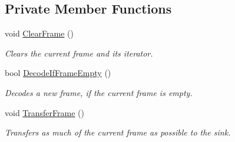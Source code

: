 \subsection*{Private Member Functions}
\begin{DoxyCompactItemize}
\item 
\hypertarget{classAudio_ad35726949e5de23e62024eba476c7ecf}{void \hyperlink{classAudio_ad35726949e5de23e62024eba476c7ecf}{Clear\+Frame} ()}\label{classAudio_ad35726949e5de23e62024eba476c7ecf}

\begin{DoxyCompactList}\small\item\em Clears the current frame and its iterator. \end{DoxyCompactList}\item 
bool \hyperlink{classAudio_a3d7e118920b983906dc915428242df2e}{Decode\+If\+Frame\+Empty} ()
\begin{DoxyCompactList}\small\item\em Decodes a new frame, if the current frame is empty. \end{DoxyCompactList}\item 
\hypertarget{classAudio_a9657995aa27bef00b6880f5a7bafd629}{void \hyperlink{classAudio_a9657995aa27bef00b6880f5a7bafd629}{Transfer\+Frame} ()}\label{classAudio_a9657995aa27bef00b6880f5a7bafd629}

\begin{DoxyCompactList}\small\item\em Transfers as much of the current frame as possible to the sink. \end{DoxyCompactList}\end{DoxyCompactItemize}
